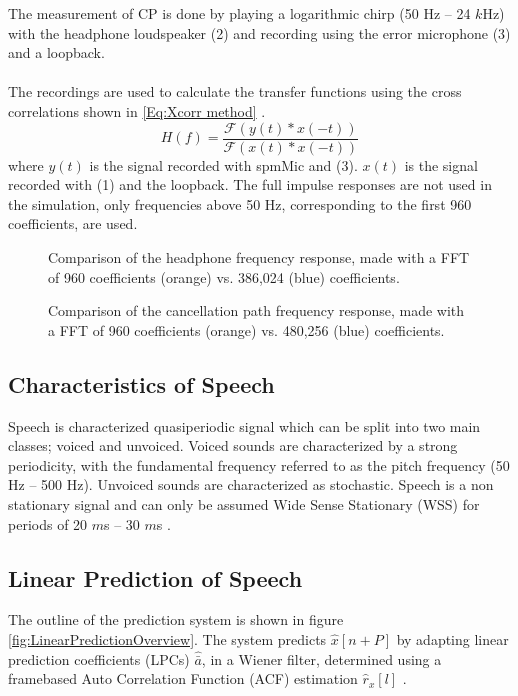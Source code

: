 The measurement of CP is done by playing a logarithmic chirp (50 Hz -- 24 $k$Hz) with the headphone loudspeaker (2) and recording using the error microphone (3) and a loopback.
\\\\
The recordings are used to calculate the transfer functions using the cross correlations shown in \autoref{Eq:Xcorr method} \cite{TutorialMeasurementPowerSpectra}.   
\begin{equation}
H(f)=\dfrac{\mathscr{F}(y(t)\ast x(-t))} {\mathscr{F}(x(t)\ast x(-t))}
\label{Eq:Xcorr method}
\end{equation}
where $y(t)$ is the signal recorded with spmMic and (3). $x(t)$ is the signal recorded with (1) and the loopback. The full impulse responses are not used in the simulation, only frequencies above 50 Hz, corresponding to the first 960 coefficients, are used.   
\begin{figure}[H]
	\centering
	
	\caption{Comparison of the headphone frequency response, made with a FFT of 960 coefficients (orange) vs. 386,024 (blue) coefficients.}
	\label{CancellationPathImpulseResponseCompare}
\end{figure}

\begin{figure}[H]
	\centering
	
	\caption{Comparison of the cancellation path frequency response, made with a FFT of 960 coefficients (orange) vs. 480,256 (blue) coefficients.}
	\label{CancellationPathImpulseResponseCompare}
\end{figure}

\subsection{Characteristics of Speech}
Speech is characterized quasiperiodic signal which can be split into two main classes; voiced and unvoiced. Voiced sounds are characterized by a strong periodicity, with the fundamental frequency referred to as the pitch frequency (50 Hz -- 500 Hz). Unvoiced sounds are characterized as stochastic. Speech is a non stationary signal and can only be assumed Wide Sense Stationary (WSS) for periods of 20 $m$s -- 30 $m$s \cite{Speech}. 

\subsection{Linear Prediction of Speech}
The outline of the prediction system is shown in figure \ref{fig:LinearPredictionOverview}. The system predicts $\hat{x}[n+P]$ by adapting linear prediction coefficients (LPCs) $\hat{\bar{a}}$, in a Wiener filter, determined using a framebased Auto Correlation Function (ACF) estimation $\hat{r}_x[l]$ \cite{LinearPrediction}.   

